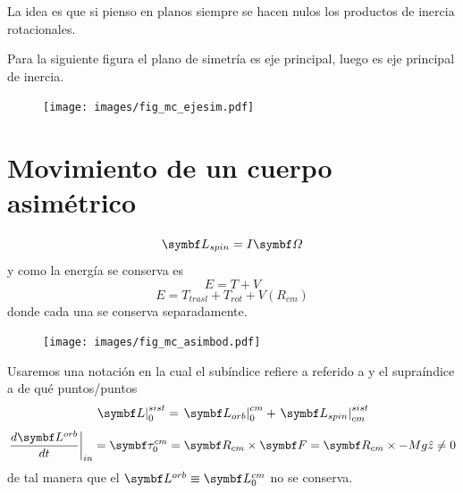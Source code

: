 \documentclass[10pt,oneside]{CBFT_book}
\begin{document}
La idea es que si pienso en planos siempre se hacen nulos los productos de inercia rotacionales.

Para la siguiente figura el plano de simetría es eje principal, luego es eje principal de inercia.
\begin{figure}[htb]
	\begin{center}
	\texttt{[image: images/fig\_mc\_ejesim.pdf]}	 
	\end{center}
	\caption{}
\end{figure} 


\section{Movimiento de un cuerpo asimétrico}

\[
	\vb{L}_{spin} = I \vb{\Omega}
\]
y como la energía se conserva es
\[
	E = T + V
\]
\[
	E = T_{trasl} + T_{rot} + V(R_{cm})
\]
donde cada una se conserva separadamente.

\begin{figure}[htb]
	\begin{center}
	\texttt{[image: images/fig\_mc\_asimbod.pdf]}	 
	\end{center}
	\caption{}
\end{figure} 

Usaremos una notación en la cual el subíndice refiere a referido a y el supraíndice a de qué puntos/puntos
\[
	\left.\vb{L}\right|_{0}^{sist} = \left.\vb{L}_{orb}\right|_{0}^{cm} + \left.\vb{L}_{spin}\right|_{cm}^{sist}  
\]
\[
	\left.\frac{d\vb{L}^{orb}}{dt}\right|_{in} = \vb{\tau}_0^{cm} = \vb{R}_{cm} \times \vb{F} =
							\vb{R}_{cm} \times - M g \hat{z} \neq 0
\]
de tal manera que el $\vb{L}^{orb} \equiv \vb{L}_0^{cm}$ no se conserva.
\end{document}
